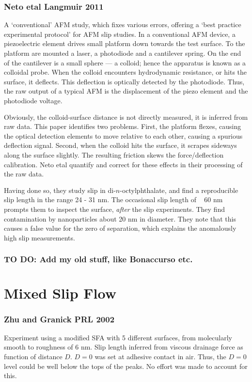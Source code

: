 \documentclass[twocolumn]{article}
\begin{document}
\subsubsection*{Neto etal Langmuir 2011}
A `conventional' AFM study, which fixes various errors, offering a `best practice experimental protocol' for AFM slip studies.  In a conventional AFM device, a piezoelectric element drives small platform down towards the test surface.  To the platform are mounted a laser, a photodiode and a cantilever spring.  On the end of the cantilever is a small sphere --- a colloid; hence the apparatus is known as a colloidal probe.  When the colloid encounters hydrodynamic resistance, or hits the surface, it deflects.  This deflection is optically detected by the photodiode. Thus, the raw output of a typical AFM is the displacement of the piezo element and the photodiode voltage.

Obviously, the colloid-surface distance is not directly measured, it is inferred from raw data.  This paper identifies two problems. First, the platform flexes, causing the optical detection elements to move relative to each other, causing a spurious deflection signal.  Second, when the colloid hits the surface, it scrapes sideways along the surface slightly.  The resulting friction skews the force/deflection calibration.  Neto etal quantify and correct for these effects in their processing of the raw data.

Having done so, they study slip in di-$n$-octylphthalate, and find a reproducible slip length in the range 24 - 31 nm.  The occasional slip length of ~ 60 nm prompts them to inspect the surface, \emph{after} the slip experiments.  They find contamination by nanoparticles about 20 nm in diameter.  They note that this causes a false value for the zero of separation, which explains the anomalously high slip measurements. 


\subsubsection*{TO DO: Add my old stuff, like Bonaccurso etc.}

\section*{Mixed Slip Flow}

\subsubsection*{Zhu and Granick PRL 2002}
Experiment using a modified SFA with 5 different surfaces, from molecularly smooth to roughness of 6 nm. Slip length inferred from viscous drainage force as function of distance $D$. $D=0$ was set at adhesive contact in air. Thus, the $D=0$ level could be well below the tops of the peaks. No effort was made to account for this.
\end{document}
